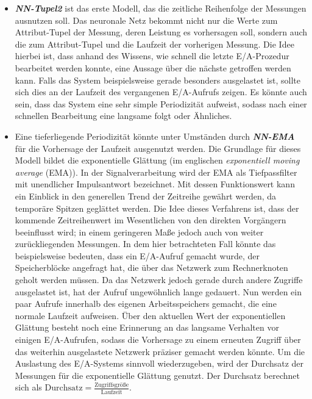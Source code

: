 \documentclass[
	twoside,
	12pt,
	a4paper,
	BCOR10mm,
	DIV14,
	listof=totoc,
	bibliography=totoc,
	headsepline
]{scrreprt}
\begin{document}
\begin{itemize}
	\item \textit{\textbf{NN-Tupel2}} ist das erste Modell, das die zeitliche Reihenfolge der Messungen ausnutzen soll. Das neuronale Netz bekommt nicht nur die Werte zum Attribut-Tupel der Messung, deren Leistung es vorhersagen soll, sondern auch die zum Attribut-Tupel und die Laufzeit der vorherigen Messung.
	Die Idee hierbei ist, dass anhand des Wissens, wie schnell die letzte E/A-Prozedur bearbeitet werden konnte, eine Aussage über die nächste getroffen werden kann. Falls das System beispielsweise gerade besonders ausgelastet ist, sollte sich dies an der Laufzeit des vergangenen E/A-Aufrufs zeigen.
	Es könnte auch sein, dass das System eine sehr simple Periodizität aufweist, sodass nach einer schnellen Bearbeitung eine langsame folgt oder Ähnliches.
	\item Eine tieferliegende Periodizität könnte unter Umständen durch \textit{\textbf{NN-EMA}} für die Vorhersage der Laufzeit ausgenutzt werden. Die Grundlage für dieses Modell bildet die exponentielle Glättung (im englischen \textit{exponentiell moving average} (EMA)). In der Signalverarbeitung wird der EMA als Tiefpassfilter mit unendlicher Impulsantwort bezeichnet.
	Mit dessen Funktionswert kann ein Einblick in den generellen Trend der Zeitreihe gewährt werden, da temporäre Spitzen geglättet werden.
	Die Idee dieses Verfahrens ist, dass der kommende Zeitreihenwert im Wesentlichen von den direkten Vorgängern beeinflusst wird; in einem geringeren Maße jedoch auch von weiter zurückliegenden Messungen.
	In dem hier betrachteten Fall könnte das beispielsweise bedeuten, dass ein E/A-Aufruf gemacht wurde, der Speicherblöcke angefragt hat, die über das Netzwerk zum Rechnerknoten geholt werden müssen. Da das Netzwerk jedoch gerade durch andere Zugriffe ausgelastet ist, hat der Aufruf ungewöhnlich lange gedauert. Nun werden ein paar Aufrufe innerhalb des eigenen Arbeitsspeichers gemacht, die eine normale Laufzeit aufweisen. Über den aktuellen Wert der exponentiellen Glättung besteht noch eine Erinnerung an das langsame Verhalten vor einigen E/A-Aufrufen, sodass die Vorhersage zu einem erneuten Zugriff über das weiterhin ausgelastete Netzwerk präziser gemacht werden könnte.
	Um die Auslastung des E/A-Systems sinnvoll wiederzugeben, wird der Durchsatz der Messungen für die exponentielle Glättung genutzt. Der Durchsatz berechnet sich als $\mbox{Durchsatz} =  \frac{\mbox{Zugriffsgröße}}{\mbox{Laufzeit}}$.
	

\end{itemize}
\end{document}

